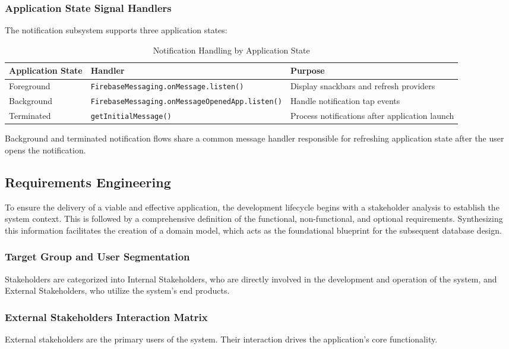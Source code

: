 \subsubsection{Application State Signal Handlers}
The notification subsystem supports three application states:
\begin{table}[htbp]
\centering
\caption{Notification Handling by Application State}
\label{tab:notification_states}
\begin{tabular}{|l|l|p{3cm}|}
\hline
\textbf{Application State} & \textbf{Handler} & \textbf{Purpose} \\
\hline
Foreground &
\texttt{FirebaseMessaging.onMessage.listen()} &
Display snackbars and refresh providers \\
\hline
Background &
\texttt{FirebaseMessaging.onMessageOpenedApp.listen()} &
Handle notification tap events \\
\hline
Terminated &
\texttt{getInitialMessage()} &
Process notifications after application launch \\
\hline
\end{tabular}
\end{table}
Background and terminated notification flows share a common message handler responsible for refreshing application state after the user opens the notification.

\subsection{Requirements Engineering}
To ensure the delivery of a viable and effective application, the development lifecycle begins with a stakeholder analysis to establish the system context. This is followed by a comprehensive definition of the functional, non-functional, and optional requirements. Synthesizing this information facilitates the creation of a domain model, which acts as the foundational blueprint for the subsequent database design.

\subsubsection{Target Group and User Segmentation}
Stakeholders are categorized into Internal Stakeholders, who are directly involved in the development and operation of the system, and External Stakeholders, who utilize the system's end products.

\subsubsection{External Stakeholders Interaction Matrix}
External stakeholders are the primary users of the system. Their interaction drives the application's core functionality.


